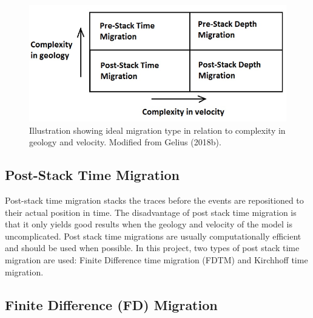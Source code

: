 \documentclass[10pt,a4paper]{article}
\begin{document}
\begin{figure}[H]
\includegraphics[scale=0.4]{types_of_migration.jpg}
\caption{Illustration showing ideal migration type in relation to complexity in geology and velocity. Modified from Gelius (2018b).}
\label{Types}
\end{figure}

\subsection{Post-Stack Time Migration}

\noindent Post-stack time migration stacks the traces before the events are repositioned to their actual position in time. The disadvantage of post stack time migration is that it only yields good results when the geology and velocity of the model is uncomplicated. Post stack time migrations are usually computationally efficient and should be used when possible. In this project, two types of post stack time migration are used: Finite Difference time migration (FDTM) and Kirchhoff time migration.

\subsection{Finite Difference (FD) Migration}
\end{document}
